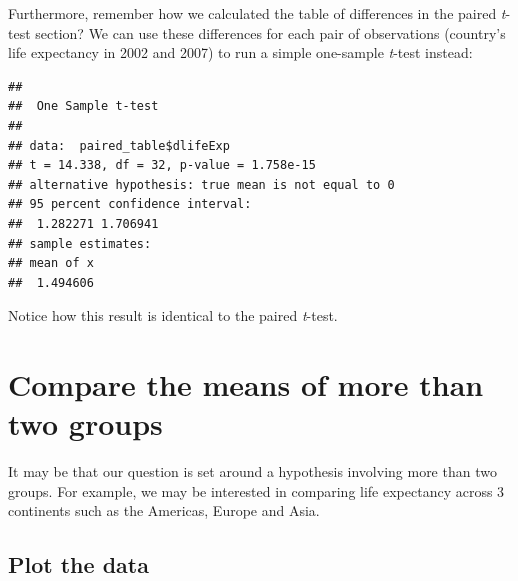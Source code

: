 \documentclass[
  12pt,
  krantz2]{krantz}
\makeatletter
\newenvironment{Shaded}{\begin{snugshade}}{\end{snugshade}}
\newcommand{\CommentTok}[1]{\textcolor[rgb]{0.56,0.35,0.01}{\textit{#1}}}
\newcommand{\DataTypeTok}[1]{\textcolor[rgb]{0.13,0.29,0.53}{#1}}
\newcommand{\DecValTok}[1]{\textcolor[rgb]{0.00,0.00,0.81}{#1}}
\newcommand{\KeywordTok}[1]{\textcolor[rgb]{0.13,0.29,0.53}{\textbf{#1}}}
\newcommand{\NormalTok}[1]{#1}
\newcommand{\OperatorTok}[1]{\textcolor[rgb]{0.81,0.36,0.00}{\textbf{#1}}}
\newcommand{\StringTok}[1]{\textcolor[rgb]{0.31,0.60,0.02}{#1}}
\newenvironment{kframe}{%
\medskip{}
\setlength{\fboxsep}{.8em}
 \def\at@end@of@kframe{}%
 \ifinner\ifhmode%
  \def\at@end@of@kframe{\end{minipage}}%
  \begin{minipage}{\columnwidth}%
 \fi\fi%
 \def\FrameCommand##1{\hskip\@totalleftmargin \hskip-\fboxsep
 \colorbox{shadecolor}{##1}\hskip-\fboxsep
     \hskip-\linewidth \hskip-\@totalleftmargin \hskip\columnwidth}%
 \MakeFramed {\advance\hsize-\width
   \@totalleftmargin\z@ \linewidth\hsize
   \@setminipage}}%
 {\par\unskip\endMakeFramed%
 \at@end@of@kframe}
\renewenvironment{Shaded}{\begin{kframe}}{\end{kframe}}
\makeatother
\begin{document}
Furthermore, remember how we calculated the table of differences in the paired \emph{t}-test section?
We can use these differences for each pair of observations (country's life expectancy in 2002 and 2007) to run a simple one-sample \emph{t}-test instead:

\begin{Shaded}
\end{Shaded}

\begin{verbatim}
## 
##  One Sample t-test
## 
## data:  paired_table$dlifeExp
## t = 14.338, df = 32, p-value = 1.758e-15
## alternative hypothesis: true mean is not equal to 0
## 95 percent confidence interval:
##  1.282271 1.706941
## sample estimates:
## mean of x 
##  1.494606
\end{verbatim}

Notice how this result is identical to the paired \emph{t}-test.

\hypertarget{compare-the-means-of-more-than-two-groups}{%
\section{Compare the means of more than two groups}\label{compare-the-means-of-more-than-two-groups}}

It may be that our question is set around a hypothesis involving more than two groups.
For example, we may be interested in comparing life expectancy across 3 continents such as the Americas, Europe and Asia.

\hypertarget{plot-the-data-2}{%
\subsection{Plot the data}\label{plot-the-data-2}}

\begin{Shaded}
\end{Shaded}
\end{document}
